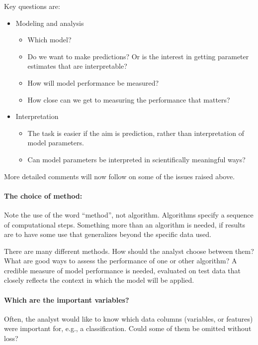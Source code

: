 \documentclass{tufte-book}\usepackage[]{graphicx}\usepackage[]{color}
\begin{document}
Key questions are:
\begin{itemize}
\item Modeling and analysis
  \begin{itemize}
    \item Which model?
    \item Do we want to make predictions?  Or is the interest in getting
parameter estimates that are interpretable?
    \item How will model performance be measured?
    \item How close can we get to measuring the performance that matters?
  \end{itemize}
\item Interpretation
  \begin{itemize}
    \item The task is easier if the aim is prediction, rather than
interpretation of model parameters.
    \item Can model parameters be interpreted in scientifically meaningful
      ways?
  \end{itemize}
\end{itemize}

More detailed comments will now follow on some of the issues raised above.

\paragraph{The choice of  method:} Note the use of the word ``method'',
not algorithm. Algorithms specify a sequence of computational steps.
Something more than an algorithm is needed, if results are to have
some use that generalizes beyond the specific data used.

There are many different methods. How should the analyst
choose between them?  What are good ways to assess the performance of
one or other algorithm? A credible measure of model performance is
needed, evaluated on test data that closely reflects the context in
which the model will be applied.

\paragraph{Which are the important variables?} Often, the analyst
would like to know which data columns (variables, or features) were
important for, e.g., a classification.  Could some of them be omitted
without loss?
\end{document}
